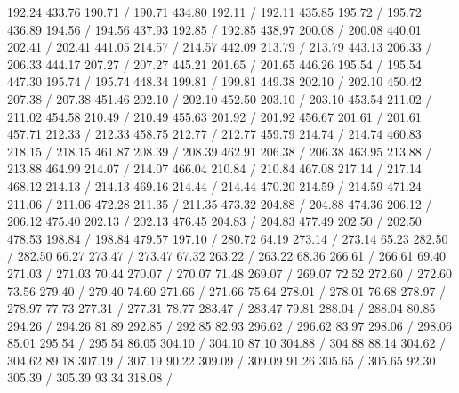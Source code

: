 { 192.24 433.76 190.71 /
 190.71 434.80 192.11 /
 192.11 435.85 195.72 /
 195.72 436.89 194.56 /
 194.56 437.93 192.85 /
 192.85 438.97 200.08 /
 200.08 440.01 202.41 /
 202.41 441.05 214.57 /
 214.57 442.09 213.79 /
 213.79 443.13 206.33 /
 206.33 444.17 207.27 /
 207.27 445.21 201.65 /
 201.65 446.26 195.54 /
 195.54 447.30 195.74 /
 195.74 448.34 199.81 /
 199.81 449.38 202.10 /
 202.10 450.42 207.38 /
 207.38 451.46 202.10 /
 202.10 452.50 203.10 /
 203.10 453.54 211.02 /
 211.02 454.58 210.49 /
 210.49 455.63 201.92 /
 201.92 456.67 201.61 /
 201.61 457.71 212.33 /
 212.33 458.75 212.77 /
 212.77 459.79 214.74 /
 214.74 460.83 218.15 /
 218.15 461.87 208.39 /
 208.39 462.91 206.38 /
 206.38 463.95 213.88 /
 213.88 464.99 214.07 /
 214.07 466.04 210.84 /
 210.84 467.08 217.14 /
 217.14 468.12 214.13 /
 214.13 469.16 214.44 /
 214.44 470.20 214.59 /
 214.59 471.24 211.06 /
 211.06 472.28 211.35 /
 211.35 473.32 204.88 /
 204.88 474.36 206.12 /
 206.12 475.40 202.13 /
 202.13 476.45 204.83 /
 204.83 477.49 202.50 /
 202.50 478.53 198.84 /
 198.84 479.57 197.10 /
\setsolid
{} 280.72 64.19 273.14 /
 273.14 65.23 282.50 /
 282.50 66.27 273.47 /
 273.47 67.32 263.22 /
 263.22 68.36 266.61 /
 266.61 69.40 271.03 /
 271.03 70.44 270.07 /
 270.07 71.48 269.07 /
 269.07 72.52 272.60 /
 272.60 73.56 279.40 /
 279.40 74.60 271.66 /
 271.66 75.64 278.01 /
 278.01 76.68 278.97 /
 278.97 77.73 277.31 /
 277.31 78.77 283.47 /
 283.47 79.81 288.04 /
 288.04 80.85 294.26 /
 294.26 81.89 292.85 /
 292.85 82.93 296.62 /
 296.62 83.97 298.06 /
 298.06 85.01 295.54 /
 295.54 86.05 304.10 /
 304.10 87.10 304.88 /
 304.88 88.14 304.62 /
 304.62 89.18 307.19 /
 307.19 90.22 309.09 /
 309.09 91.26 305.65 /
 305.65 92.30 305.39 /
 305.39 93.34 318.08 /
}
